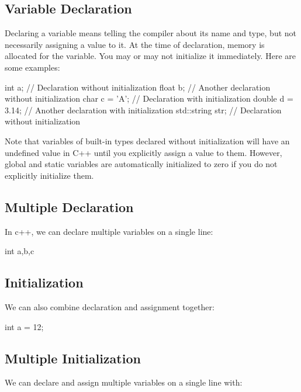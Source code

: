 \documentclass{report}
\begin{document}
    \pagebreak
    \subsection{Variable Declaration}
    \bigbreak \noindent 
    Declaring a variable means telling the compiler about its name and type, but not necessarily assigning a value to it. At the time of declaration, memory is allocated for the variable. You may or may not initialize it immediately. Here are some examples:
    \bigbreak \noindent 
    
    \begin{cppcode}
int a;              // Declaration without initialization
float b;            // Another declaration without initialization
char c = 'A';       // Declaration with initialization
double d = 3.14;    // Another declaration with initialization
std::string str;    // Declaration without initialization
    \end{cppcode}
    
    \bigbreak \noindent 
    Note that variables of built-in types declared without initialization will have an undefined value in C++ until you explicitly assign a value to them. However, global and static variables are automatically initialized to zero if you do not explicitly initialize them.

    \bigbreak \noindent 
    \subsection{Multiple Declaration}
    \bigbreak \noindent 
    In c++, we can declare multiple variables on a single line:
    \bigbreak \noindent 
    
    \begin{cppcode}
int a,b,c
    \end{cppcode}
    

    \bigbreak \noindent 
    \subsection{Initialization}
    \bigbreak \noindent 
    We can also combine declaration and assignment together:
    \bigbreak \noindent 
    
    \begin{cppcode}
int a = 12;
    \end{cppcode}
    

    \bigbreak \noindent 
    \subsection{Multiple Initialization}
    \bigbreak \noindent 
    We can declare and assign multiple variables on a single line with:
    \bigbreak \noindent 
    
\end{document}
